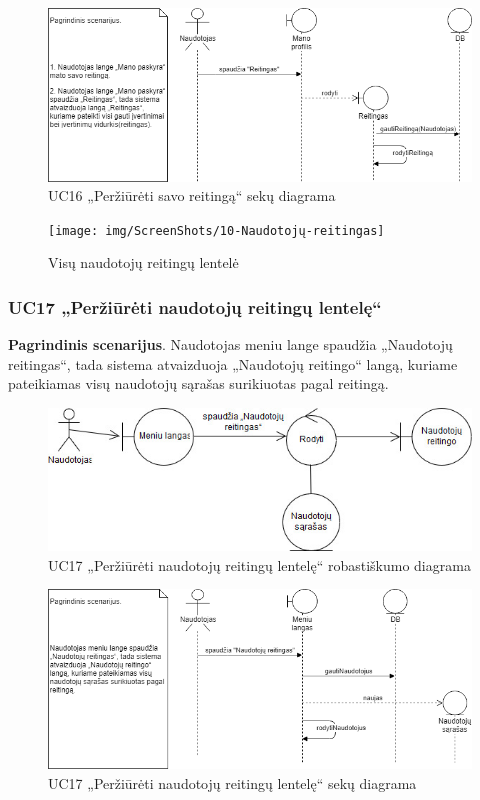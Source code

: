 \documentclass{VUMIFPSbakalaurinis}
\begin{document}
\begin{figure}[H]
	\centering
	\includegraphics[scale=0.6]{img/Sequence/SD16}
	\caption{UC16 „Peržiūrėti savo reitingą“ sekų diagrama}
	\label{img:uc16seq}
\end{figure}

\begin{figure}[H]
	\centering
	\texttt{[image: img/ScreenShots/10-Naudotojų-reitingas]}
	\caption{Visų naudotojų reitingų lentelė}
	\label{img:rating table}
\end{figure}
\subsubsection{UC17 „Peržiūrėti naudotojų reitingų lentelę“}
\textbf{Pagrindinis scenarijus}. Naudotojas meniu lange spaudžia „Naudotojų reitingas“, tada sistema atvaizduoja „Naudotojų reitingo“ langą, kuriame pateikiamas visų naudotojų sąrašas surikiuotas pagal reitingą.

\begin{figure}[H]
	\centering
	\includegraphics[scale=0.6]{img/Robustness/UC17}
	\caption{UC17 „Peržiūrėti naudotojų reitingų lentelę“ robastiškumo diagrama}
	\label{img:uc17rob}
\end{figure}

\begin{figure}[H]
	\centering
	\includegraphics[scale=0.6]{img/Sequence/SD17}
	\caption{UC17 „Peržiūrėti naudotojų reitingų lentelę“ sekų diagrama}
	\label{img:uc17seq}
\end{figure}
\end{document}

